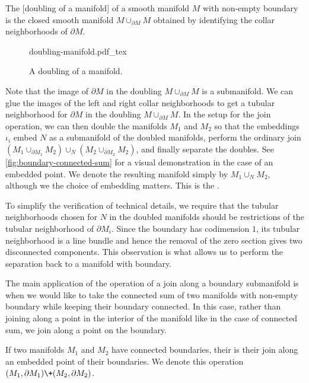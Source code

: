 \begin{definition}
	The [doubling of a manifold] of a smooth manifold $M$ with non-empty boundary is the closed smooth manifold $M\cup_{\partial M} M$ obtained by identifying the collar neighborhoods of $\partial M$.
\end{definition}
\begin{figure}[ht]
	\centering
	{doubling-manifold.pdf_tex}
	\caption{A doubling of a manifold.}
\end{figure}
Note that the image of $\partial M$ in the doubling $M\cup_{\partial M} M$ is a submanifold. We can glue the images of the left and right collar neighborhoods to get a tubular neighborhood for $\partial M$ in the doubling $M\cup_{\partial M} M$.
In the setup for the join operation, we can then double the manifolds $M_1$ and $M_2$ so that the embeddings $\iota_i$ embed $N$ as a submanifold of the doubled manifolds, perform the ordinary join $(M_1\cup_{\partial M_1} M_2)\cup_N (M_2\cup_{\partial M_2} M_2)$, and finally separate the doubles. See \cref{fig:boundary-connected-sum} for a visual demonstration in the case of an embedded point. We denote the resulting manifold simply by $M_1\cup_N M_2$, although we the choice of embedding matters. This is the .

\begin{remark}
	To simplify the verification of technical details, we require that the tubular neighborhoods chosen for $N$ in the doubled manifolds should be restrictions of the tubular neighborhood of $\partial M_i$. Since the boundary has codimension $1$, its tubular neighborhood is a line bundle and hence the removal of the zero section gives two disconnected components. This observation is what allows us to perform the separation back to a manifold with boundary.
\end{remark}

The main application of the operation of a join along a boundary submanifold is when we would like to take the connected sum of two manifolds with non-empty boundary while keeping their boundary connected. In this case, rather than joining along a point in the interior of the manifold like in the case of connected sum, we join along a point on the boundary.

\begin{definition}
	If two manifolds $M_1$ and $M_2$ have connected boundaries, their  is their join along an embedded point of their boundaries. We denote this operation $(M_1,\partial M_1)\+ (M_2,\partial M_2)$.
\end{definition}

